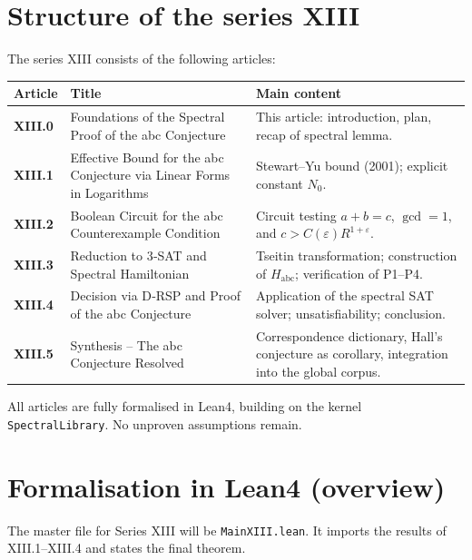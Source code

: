 \documentclass[11pt,a4paper]{article}
\begin{document}
\section{Structure of the series XIII}

The series XIII consists of the following articles:

\begin{center}
\small
\begin{tabular}{@{}>{\bfseries}l>{\raggedright\arraybackslash}p{4.5cm}>{\raggedright\arraybackslash}p{6cm}@{}}
\toprule
\textbf{Article} & \textbf{Title} & \textbf{Main content} \\
\midrule
XIII.0 & Foundations of the Spectral Proof of the abc Conjecture & This article: introduction, plan, recap of spectral lemma. \\
XIII.1 & Effective Bound for the abc Conjecture via Linear Forms in Logarithms & Stewart–Yu bound (2001); explicit constant $N_0$. \\
XIII.2 & Boolean Circuit for the abc Counterexample Condition & Circuit testing $a+b=c$, $\gcd=1$, and $c > C(\varepsilon)R^{1+\varepsilon}$. \\
XIII.3 & Reduction to 3‑SAT and Spectral Hamiltonian & Tseitin transformation; construction of $H_{\text{abc}}$; verification of P1–P4. \\
XIII.4 & Decision via D‑RSP and Proof of the abc Conjecture & Application of the spectral SAT solver; unsatisfiability; conclusion. \\
XIII.5 & Synthesis – The abc Conjecture Resolved & Correspondence dictionary, Hall's conjecture as corollary, integration into the global corpus. \\
\bottomrule
\end{tabular}
\normalsize
\end{center}

All articles are fully formalised in Lean4, building on the kernel \texttt{SpectralLibrary}. No unproven assumptions remain.

\section{Formalisation in Lean4 (overview)}

The master file for Series XIII will be \texttt{MainXIII.lean}. It imports the results of XIII.1–XIII.4 and states the final theorem.
\end{document}
